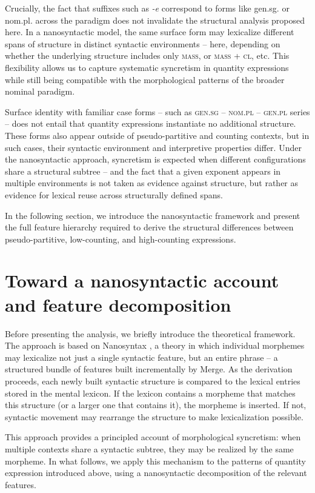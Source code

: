 \documentclass[output=paper,colorlinks,citecolor=brown
]{langscibook}
\begin{document}
Crucially, the fact that suffixes such as \textit{-e} correspond to forms like gen.sg. or nom.pl. across the paradigm does not invalidate the structural analysis proposed here. In a nanosyntactic model, the same surface form may lexicalize different spans of structure in distinct syntactic environments – here, depending on whether the underlying structure includes only \textsc{mass}, or \textsc{mass + cl}, etc. This flexibility allows us to capture systematic syncretism in quantity expressions while still being compatible with the morphological patterns of the broader nominal paradigm.

Surface identity with familiar case forms – such as \textsc{gen.sg} – \textsc{nom.pl} – \textsc{gen.pl} series – does not entail that quantity expressions instantiate no additional structure. These forms also appear outside of pseudo-partitive and counting contexts, but in such cases, their syntactic environment and interpretive properties differ. Under the nanosyntactic approach, syncretism is expected when different configurations share a structural subtree – and the fact that a given exponent appears in multiple environments is not taken as evidence against structure, but rather as evidence for lexical reuse across structurally defined spans.

In the following section, we introduce the nanosyntactic framework and present the full feature hierarchy required to derive the structural differences between pseudo-partitive, low-counting, and high-counting expressions.

\section{Toward a nanosyntactic account and feature decomposition}\label{zoha:sec:nano}

Before presenting the analysis, we briefly introduce the theoretical framework. The approach is based on Nanosyntax \citep{Starke2009,Caha2009}, a theory in which individual morphemes may lexicalize not just a single syntactic feature, but an entire phrase -- a structured bundle of features built incrementally by Merge. As the derivation proceeds, each newly built syntactic structure is compared to the lexical entries stored in the mental lexicon. If the lexicon contains a morpheme that matches this structure (or a larger one that contains it), the morpheme is inserted. If not, syntactic movement may rearrange the structure to make lexicalization possible. 

This approach provides a principled account of morphological syncretism: when multiple contexts share a syntactic subtree, they may be realized by the same morpheme. In what follows, we apply this mechanism to the patterns of quantity expression introduced above, using a nanosyntactic decomposition of the relevant features.
\end{document}
